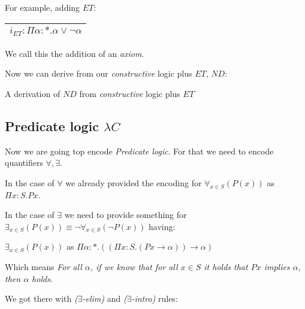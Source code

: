 \documentclass[12pt, a4paper]{article}
\begin{document}
For example, adding $ET$:

\begin{tabular}[]{|c|}
    \hline
    $i_{ET} : \Pi \alpha : *. \alpha \lor \neg \alpha$\\
    \hline
\end{tabular}

We call this the addition of an \textit{axiom}. 

Now we can derive from our \textit{constructive} logic plus $ET$, $ND$:

\begin{flagderiv}
    \assume{}{\beta : *}{}
    \caption{A derivation of $ND$ from \textit{constructive} logic plus $ET$}
\end{flagderiv}

\subsection{Predicate logic \texorpdfstring{$\lambda C$}{}}
Now we are going top encode \textit{Predicate logic}. For that we need to encode quantifiers $\forall, \exists$.

In the case of $\forall$ we already provided the encoding for $\forall_{x \in S}(P(x))$ as $\Pi x : S. Px$.

In the case of $\exists$ we need to provide something for $\exists_{x \in S}(P(x)) \equiv \neg \forall_{x \in S}(\neg P(x))$ having:

$\exists_{x \in S}(P(x))$ as $\Pi \alpha : *. ((\Pi x : S. (Px \to \alpha)) \to \alpha)$

Which means \textit{For all $\alpha$, if we know that for all $x \in S$ it holds that $Px$ implies $\alpha$, then $\alpha$ holds}.

We got there with \textit{($\exists$-elim)} and \textit{($\exists$-intro)} rules:
\end{document}
